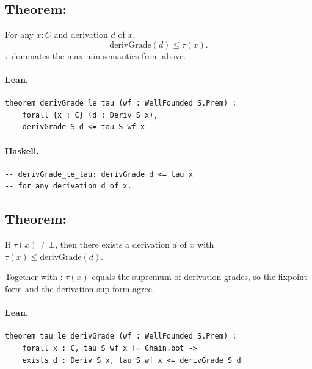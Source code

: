 \documentclass[11pt,a4paper]{article}
\begin{document}
\subsection{Theorem: }

\begin{thm}
For any $x : C$ and derivation $d$ of $x$,
\[
  \mathrm{derivGrade}(d) \le \tau(x).
\]
$\tau$ dominates the max-min semantics from above.
\end{thm}

\paragraph{Lean.}
\begin{lstlisting}[style=lean]
theorem derivGrade_le_tau (wf : WellFounded S.Prem) :
    forall {x : C} (d : Deriv S x),
    derivGrade S d <= tau S wf x
\end{lstlisting}

\paragraph{Haskell.}
\begin{lstlisting}[style=haskell]
-- derivGrade_le_tau: derivGrade d <= tau x
-- for any derivation d of x.
\end{lstlisting}


\subsection{Theorem: }

\begin{thm}
If $\tau(x) \ne \bot$, then there exists a derivation $d$ of $x$ with
$\tau(x) \le \mathrm{derivGrade}(d)$.

Together with : $\tau(x)$ equals the supremum of
derivation grades, so the fixpoint form and the derivation-sup form agree.
\end{thm}

\paragraph{Lean.}
\begin{lstlisting}[style=lean]
theorem tau_le_derivGrade (wf : WellFounded S.Prem) :
    forall x : C, tau S wf x != Chain.bot ->
    exists d : Deriv S x, tau S wf x <= derivGrade S d
\end{lstlisting}
\end{document}

